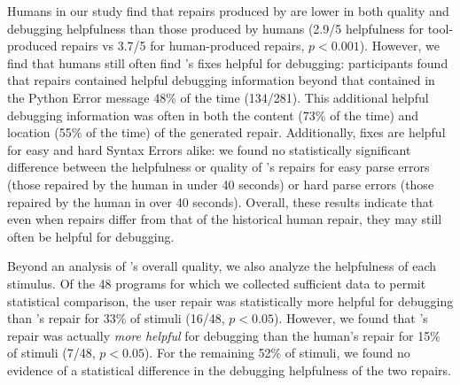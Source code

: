  Humans in our study find that repairs produced by
\toolname are lower in both quality and debugging helpfulness than those produced
by humans (2.9/5 helpfulness for tool-produced repairs vs 3.7/5 for human-produced
repairs, $p < 0.001$). However, we find that humans still often find \toolname's fixes
helpful for debugging: participants found that \toolname repairs contained helpful
debugging information beyond that contained in the Python Error message 48\% of
the time (134/281). This additional helpful debugging information was often in both
the content (73\% of the time) and location (55\% of the time) of the generated
repair. Additionally, \toolname fixes are helpful for easy and hard Syntax Errors
alike: we found no statistically significant difference between the helpfulness or
quality of \toolname's repairs for easy parse errors (those repaired by the human in under
40 seconds) or hard parse errors (those repaired by the human in over 40 seconds). %
Overall, these results indicate that even when \toolname repairs differ from
that of the historical human repair, they may still often be helpful for debugging.

 Beyond an analysis of \toolname's overall quality, we also
analyze the helpfulness of each stimulus. %
Of the 48 programs for which we collected sufficient data to permit statistical
comparison, the user repair was statistically more helpful for debugging than \toolname's
repair for 33\% of stimuli (16/48, $p<0.05$). However, we found that \toolname's
repair was actually \emph{more helpful} for debugging than the human's repair for 15\% of
stimuli (7/48, $p<0.05$). For the remaining 52\% of stimuli, we found no evidence of a
statistical difference in the debugging helpfulness of the two repairs.

